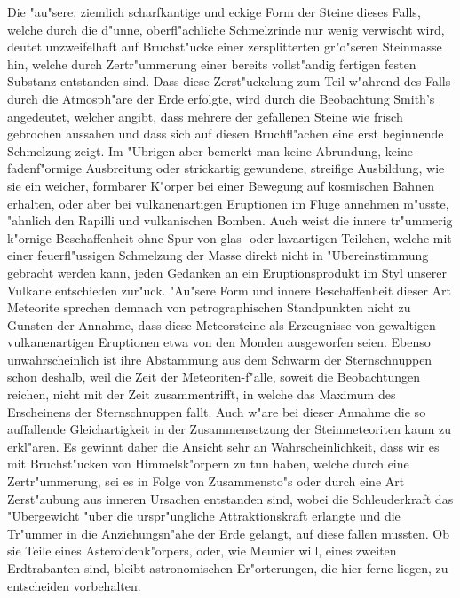 \documentclass[a4paper, 11pt, oneside]{article}
\begin{document}
Die "au"sere, ziemlich scharfkantige und eckige Form der Steine dieses Falls, welche durch die d"unne, oberfl"achliche Schmelzrinde nur wenig verwischt wird, deutet unzweifelhaft auf Bruchst"ucke einer zersplitterten gr"o"seren Steinmasse hin, welche durch Zertr"ummerung einer bereits vollst"andig fertigen festen Substanz entstanden sind. Dass diese Zerst"uckelung zum Teil w"ahrend des Falls durch die Atmosph"are der Erde erfolgte, wird durch die Beobachtung Smith's angedeutet, welcher angibt, dass mehrere der gefallenen Steine wie frisch gebrochen aussahen und dass sich auf diesen Bruchfl"achen eine erst beginnende Schmelzung zeigt. Im "Ubrigen aber bemerkt man keine Abrundung, keine fadenf"ormige Ausbreitung oder strickartig gewundene, streifige Ausbildung, wie sie ein weicher, formbarer K"orper bei einer Bewegung auf kosmischen Bahnen erhalten, oder aber bei vulkanenartigen Eruptionen im Fluge annehmen m"usste, "ahnlich den Rapilli und vulkanischen Bomben. Auch weist die innere tr"ummerig k"ornige Beschaffenheit ohne Spur von glas- oder lavaartigen Teilchen, welche mit einer feuerfl"ussigen Schmelzung der Masse direkt nicht in "Ubereinstimmung gebracht werden kann, jeden Gedanken an ein Eruptionsprodukt im Styl unserer Vulkane entschieden zur"uck. "Au"sere Form und innere Beschaffenheit dieser Art Meteorite sprechen demnach von petrographischen Standpunkten nicht zu Gunsten der Annahme, dass diese Meteorsteine als Erzeugnisse von gewaltigen vulkanenartigen Eruptionen etwa von den Monden ausgeworfen seien. Ebenso unwahrscheinlich ist ihre Abstammung aus dem Schwarm der Sternschnuppen schon deshalb, weil die Zeit der Meteoriten-f"alle, soweit die Beobachtungen reichen, nicht mit der Zeit zusammentrifft, in welche das Maximum des Erscheinens der Sternschnuppen fallt. Auch w"are bei dieser Annahme die so auffallende Gleichartigkeit in der Zusammensetzung der Steinmeteoriten kaum zu erkl"aren. Es gewinnt daher die Ansicht sehr an Wahrscheinlichkeit, dass wir es mit Bruchst"ucken von Himmelsk"orpern zu tun haben, welche durch eine Zertr"ummerung, sei es in Folge von Zusammensto"s oder durch eine Art Zerst"aubung aus inneren Ursachen entstanden sind, wobei die Schleuderkraft das "Ubergewicht "uber die urspr"ungliche Attraktionskraft erlangte und die Tr"ummer in die Anziehungsn"ahe der Erde gelangt, auf diese fallen mussten. Ob sie Teile eines Asteroidenk"orpers, oder, wie Meunier will, eines zweiten Erdtrabanten sind, bleibt astronomischen Er"orterungen, die hier ferne liegen, zu entscheiden vorbehalten.
\clearpage
\subsection{}
\end{document}

